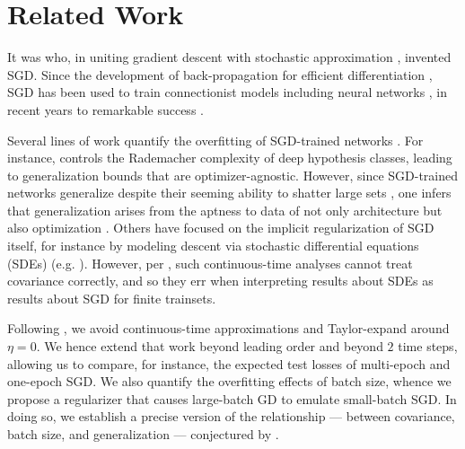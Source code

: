 \documentclass{article}
\theoremstyle{plain}
\theoremstyle{definition}
\begin{document}

\section{Related Work} \label{sect:related}


    It was \citet{ki52} who, in uniting gradient descent \citep{ca47} with
    stochastic approximation \citep{ro51}, invented SGD.  Since the development
    of back-propagation for efficient differentiation \citep{we74}, SGD has
    been used to train connectionist models including neural networks
    \citep{bo91}, in recent years to remarkable success \citep{le15}.


    Several lines of work quantify the overfitting of SGD-trained networks
    \citep{ne17a}.  For instance, \citet{ba17} controls the Rademacher
    complexity of deep hypothesis classes, leading to generalization bounds
    that are optimizer-agnostic.  However, since SGD-trained networks
    generalize despite their seeming ability to shatter large sets
    \citep{zh17}, one infers that generalization arises from the aptness to
    data of not only architecture but also optimization \citep{ne17b}.  Others
    have focused on the implicit regularization of SGD itself, for instance by
    modeling descent via stochastic differential equations (SDEs) (e.g.
    \citet{ch18}).  However, per \citet{ya19a}, such continuous-time analyses
    cannot treat covariance correctly, and so they err when interpreting
    results about SDEs as results about SGD for finite trainsets.


    Following \citet{ro18}, we avoid continuous-time approximations and
    Taylor-expand around $\eta=0$.  We hence
    extend that work beyond leading order and beyond $2$ time steps,
    allowing us to compare, for instance, the expected test losses of
    multi-epoch and one-epoch SGD.  We also quantify the overfitting effects of
    batch size, whence we propose a regularizer that causes large-batch
    GD to emulate small-batch SGD.  In doing so, we establish a precise version
    of the relationship --- between covariance, batch size, and generalization
    --- conjectured by \citet{ja18}.  
    
\end{document}
